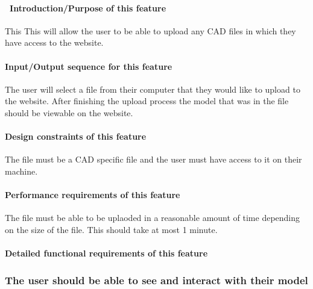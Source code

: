 \documentclass[letterpaper, 10pt, draftclsnofoot, onecolumn]{IEEEtran}
\begin{document}
{\paragraph[\ Introduction/Purpose of this
feature]{\foreignlanguage{english}{\ }\foreignlanguage{english}{Introduction/Purpose
of this feature}}
{\color{black}
This This will allow the user to be able to upload any CAD files in which they have access to the website. }

\paragraph[Input/Output sequence for this
feature]{\rmfamily\bfseries\color{black}
Input/Output sequence for this feature}
{\color{black}
The user will select a file from their computer that they would like to upload to the website. After finishing the upload process the 
model that was in the file should be viewable on the website. }

\paragraph[Design constraints of this
feature]{\rmfamily\bfseries\color{black} Design
constraints of this feature}
{\color{black}
The file must be a CAD specific file and the user must have access to it on their machine. }

\paragraph[Performance requirements of this
feature]{\rmfamily\bfseries\color{black}
Performance requirements of this feature}
{\color{black}
The file must be able to be uplaoded in a reasonable amount of time depending on the size of the file. This should take at most 1 minute. }

\paragraph[Detailed functional requirements of this
feature]{\rmfamily\bfseries\color{black}
Detailed functional requirements of this feature}


\subsubsection[{Viewable model}]{\rmfamily\bfseries\color{black}The user should be able to see and interact with their model}
}
\end{document}
